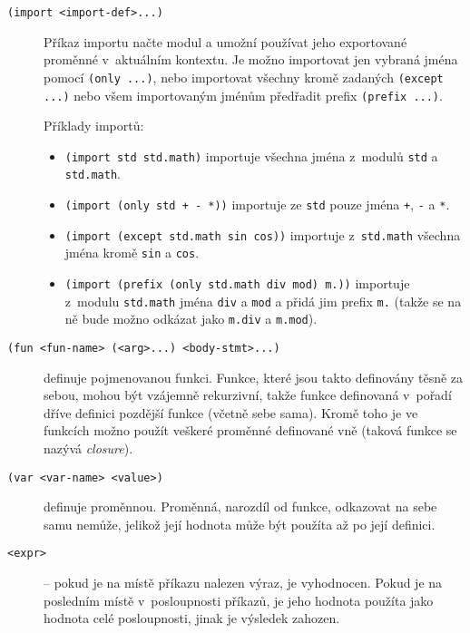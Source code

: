\begin{description}

\item[\texttt{(import <import-def>...)}] Příkaz importu načte modul a umožní
  používat jeho exportované proměnné v~aktuálním kontextu. Je možno importovat jen
  vybraná jména pomocí \texttt{(only ...)}, nebo importovat všechny kromě zadaných
  \texttt{(except ...)} nebo všem importovaným jménům předřadit prefix
  \texttt{(prefix ...)}.

  Příklady importů:

  \begin{itemize}
    \item \texttt{(import std std.math)} importuje všechna jména z~modulů
      \texttt{std} a \texttt{std.math}.
    \item \texttt{(import (only std + - *))} importuje ze \texttt{std} pouze jména
      \texttt{+}, \texttt{-} a \texttt{*}.
    \item \texttt{(import (except std.math sin cos))} importuje
      z~\texttt{std.math} všechna jména kromě \texttt{sin} a \texttt{cos}.
    \item \texttt{(import (prefix (only std.math div mod) m.))} importuje z~modulu
      \texttt{std.math} jména \texttt{div} a \texttt{mod} a přidá jim prefix
      \texttt{m.} (takže se na ně bude možno odkázat jako \texttt{m.div} a
      \texttt{m.mod}).
  \end{itemize}

\item[\texttt{(fun <fun-name> (<arg>...) <body-stmt>...)}] definuje pojmenovanou
  funkci. Funkce, které jsou takto definovány těsně za sebou, mohou být vzájemně
  rekurzivní, takže funkce definovaná v~pořadí dříve  definici pozdější
  funkce (včetně sebe sama). Kromě toho je ve funkcích možno použít veškeré
  proměnné definované vně (taková funkce se nazývá \emph{closure}).

\item[\texttt{(var <var-name> <value>)}] definuje proměnnou. Proměnná, narozdíl
  od funkce, odkazovat na sebe samu nemůže, jelikož její hodnota může být použíta
  až po její definici.

\item[\texttt{<expr>}] -- pokud je na místě příkazu nalezen výraz, je vyhodnocen.
  Pokud je na posledním místě v~posloupnosti příkazů, je jeho hodnota použíta jako
  hodnota celé posloupnosti, jinak je výsledek zahozen.

\end{description}

